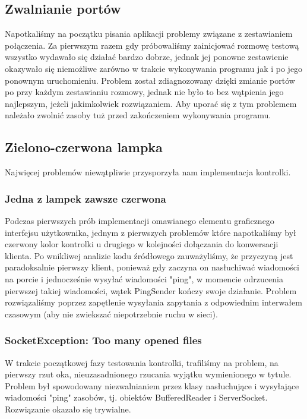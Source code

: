 \documentclass[a4paper,11pt]{article}
\begin{document}
\subsection{Zwalnianie portów}
Napotkaliśmy na początku pisania aplikacji problemy związane z zestawianiem połączenia. Za pierwszym razem gdy próbowaliśmy zainicjować rozmowę testową wszystko wydawało się działać bardzo dobrze, jednak jej ponowne zestawienie okazywało się niemożliwe zarówno w trakcie wykonywania programu jak i po jego ponownym uruchomieniu. Problem został zdiagnozowany dzięki zmianie portów po przy każdym zestawianiu rozmowy, jednak nie było to bez wątpienia jego najlepszym, jeżeli jakimkolwiek rozwiązaniem. Aby uporać się z tym problemem należało zwolnić zasoby tuż przed zakończeniem wykonywania programu.

\subsection{Zielono-czerwona lampka}
Najwięcej problemów niewątpliwie przysporzyła nam implementacja kontrolki.

\subsubsection{Jedna z lampek zawsze czerwona}
Podczas pierwszych prób implementacji omawianego elementu graficznego interfejsu użytkownika, jednym z pierwszych problemów które napotkaliśmy był czerwony kolor kontrolki u drugiego w kolejności dołączania do konwersacji klienta. Po wnikliwej analizie kodu źródłowego zauważyliśmy, że przyczyną jest paradoksalnie pierwszy klient, ponieważ gdy zaczyna on nasłuchiwać wiadomości na porcie i jednocześnie wysyłać wiadomości "ping", w momencie odrzucenia pierwszej takiej wiadomości, wątek PingSender kończy swoje działanie.
Problem rozwiązaliśmy poprzez zapętlenie wysyłania zapytania z odpowiednim interwałem czasowym (aby nie zwiekszać niepotrzebnie ruchu w sieci).

\subsubsection{SocketException: Too many opened files}
W trakcie początkowej fazy testowania kontrolki, trafiliśmy na problem, na pierwszy rzut oka, nieuzasadnionego rzucania wyjątku wymienionego w tytule.
Problem był spowodowany niezwalnianiem przez klasy nasłuchujące\newline
i wysyłające wiadomości "ping" zasobów, tj. obiektów BufferedReader i ServerSocket.
Rozwiązanie okazało się trywialne.
\end{document}
